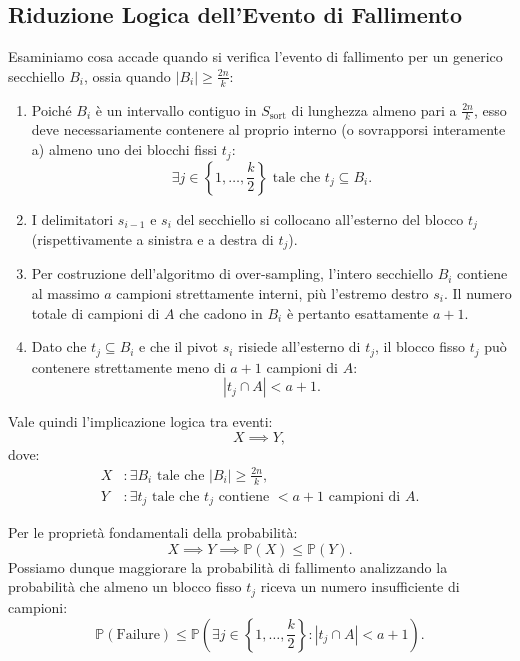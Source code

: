 \subsection{Riduzione Logica dell'Evento di Fallimento}
Esaminiamo cosa accade quando si verifica l'evento di fallimento per un generico secchiello $B_i$, ossia quando $|B_i| \ge \frac{2n}{k}$:
\begin{enumerate}
  \item Poiché $B_i$ è un intervallo contiguo in $S_{\text{sort}}$ di lunghezza almeno pari a $\frac{2n}{k}$, esso deve necessariamente contenere al proprio interno (o sovrapporsi interamente a) almeno uno dei blocchi fissi $t_j$:
  \begin{equation}
    \exists j \in \left\{1, \dots, \frac{k}{2}\right\} \text{ tale che } t_j \subseteq B_i.
  \end{equation}
  \item I delimitatori $s_{i-1}$ e $s_i$ del secchiello si collocano all'esterno del blocco $t_j$ (rispettivamente a sinistra e a destra di $t_j$).
  \item Per costruzione dell'algoritmo di over-sampling, l'intero secchiello $B_i$ contiene al massimo $a$ campioni strettamente interni, più l'estremo destro $s_i$. Il numero totale di campioni di $A$ che cadono in $B_i$ è pertanto esattamente $a + 1$.
  \item Dato che $t_j \subseteq B_i$ e che il pivot $s_i$ risiede all'esterno di $t_j$, il blocco fisso $t_j$ può contenere strettamente meno di $a + 1$ campioni di $A$:
  \begin{equation}
    |t_j \cap A| < a + 1.
  \end{equation}
\end{enumerate}

Vale quindi l'implicazione logica tra eventi:
\begin{equation}
  X \implies Y,
\end{equation}
dove:
\begin{align}
  X &\colon \exists B_i \text{ tale che } |B_i| \ge \frac{2n}{k}, \\
  Y &\colon \exists t_j \text{ tale che } t_j \text{ contiene } < a + 1 \text{ campioni di } A.
\end{align}

Per le proprietà fondamentali della probabilità:
\begin{equation}
  X \implies Y \implies \mathbb{P}(X) \le \mathbb{P}(Y).
\end{equation}
Possiamo dunque maggiorare la probabilità di fallimento analizzando la probabilità che almeno un blocco fisso $t_j$ riceva un numero insufficiente di campioni:
\begin{equation}
  \mathbb{P}(\text{Failure}) \le \mathbb{P}\left(\exists j \in \left\{1, \dots, \frac{k}{2}\right\} \colon |t_j \cap A| < a + 1\right).
\end{equation}

